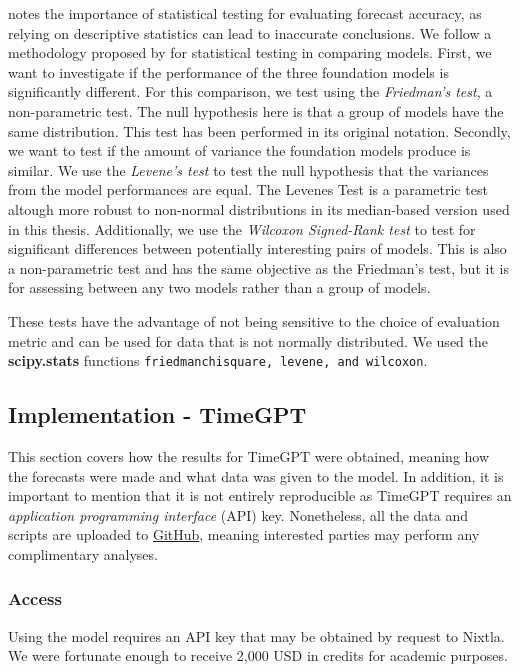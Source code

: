 \documentclass[12pt,a4paper]{article}
\begin{document}
\cite{Koning2005} notes the importance of statistical testing for evaluating forecast accuracy, as relying on descriptive statistics can lead to inaccurate conclusions. We follow a methodology proposed by \cite{Rainio2024} for statistical testing in comparing models. First, we want to investigate if the performance of the three foundation models is significantly different. For this comparison, we test using the \textit{Friedman’s test}, a non-parametric test. The null hypothesis here is that a group of models have the same distribution. This test has been performed in its original notation. Secondly, we want to test if the amount of variance the foundation models produce is similar. We use the \textit{Levene’s test} to test the null hypothesis that the variances from the model performances are equal. The Levenes Test is a parametric test altough more robust to non-normal distributions in its median-based version used in this thesis. Additionally, we use the \textit{Wilcoxon Signed-Rank test} to test for significant differences between potentially interesting pairs of models. This is also a non-parametric test and has the same objective as the Friedman’s test, but it is for assessing between any two models rather than a group of models. 


These tests have the advantage of not being sensitive to the choice of evaluation metric and can be used for data that is not normally distributed. We used the \textbf{scipy.stats} functions \texttt{friedmanchisquare, levene, and wilcoxon}.

\subsection{Implementation - TimeGPT}

This section covers how the results for TimeGPT were obtained, meaning how the forecasts were made and what data was given to the model. In addition, it is important to mention that it is not entirely reproducible as TimeGPT requires an \textit{application programming interface} (API) key. Nonetheless, all the data and scripts are uploaded to \href{https://github.com/tom-alten/OutsmartingTime/}{GitHub}, meaning interested parties may perform any complimentary analyses.  

\subsubsection{Access}

Using the model requires an API key that may be obtained by request to Nixtla. We were fortunate enough to receive 2,000 USD in credits for academic purposes. 
\end{document}
